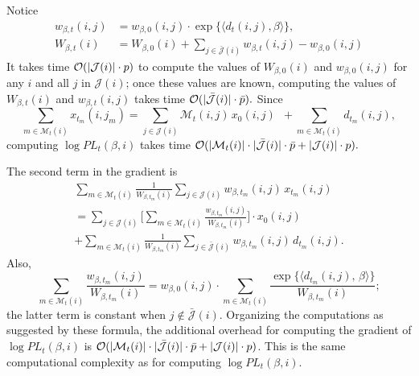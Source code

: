 \documentclass[aoas,preprint]{imsart}
\begin{document}
Notice
\begin{align*}
    w_{\beta,t}(i,j)
        &=
            w_{\beta,0}(i,j)
            \cdot
            \exp\{ \langle d_t(i,j), \beta \rangle \}, \\
    W_{\beta,t}(i)
        &=
            W_{\beta,0}(i)
            +
            \sum_{j \in \mathcal{\bar J}(i)}
                w_{\beta,t}(i,j) - w_{\beta,0}(i,j)
\end{align*}
It takes time $\mathcal{O}(|\mathcal{J}(i)| \cdot p)$ to compute the values of
$W_{\beta,0}(i)$ and $w_{\beta,0}(i,j)$ for any $i$ and all
$j$ in $\mathcal{J}(i)$; once these values are known, computing the values
of $W_{\beta,t}(i)$ and $w_{\beta,t}(i,j)$ takes time
\(
    \mathcal{O}(|\mathcal{\bar J}(i)| \cdot \bar p).
\)
Since
\[
    \sum_{m\in \mathcal{M}_t(i)}
        x_{t_m}\!(i,j_m)
        =
            \sum_{j \in \mathcal{J}(i)}
                \mathcal{M}_t(i,j) \, x_0(i,j)
            \,\,\,
            +
            \sum_{m \in \mathcal{M}_t(i)}
                d_{t_m}\!(i,j),
\]
computing $\log \mathit{PL}_t(\beta, i)$ takes time
\(
    \mathcal{O}(
        |\mathcal{M}_t(i)| \cdot |\mathcal{\bar J}(i)| \cdot \bar p
        +
        |\mathcal{J}(i)| \cdot p
    ).
\)

The second term in the gradient is
\begin{multline*}
    \sum_{m \in \mathcal{M}_t(i)}
        \frac{1}{W_{\beta,t_m}\!(i)}
        \sum_{j \in \mathcal{J}(i)}
            w_{\beta,t_m}\!(i,j)
            \,
            x_{t_m}\!(i,j) \\
    =
    \sum_{j \in \mathcal{J}(i)}
    \bigg[
        \sum_{m \in \mathcal{M}_t(i)}
            \frac{w_{\beta,t_m}\!(i,j)}{W_{\beta,t_m}\!(i)}
    \bigg]
    \cdot
    x_0(i,j) \\
    +
    \sum_{m \in \mathcal{M}_t(i)}
        \frac{1}{W_{\beta, t_m}\!(i)}
        \sum_{j \in \mathcal{\bar J}(i)}
            w_{\beta,t_m}\!(i,j)
            \,
            d_{t_m}\!(i,j).
\end{multline*}
Also,
\[
    \sum_{m \in \mathcal{M}_t(i)}
        \frac{w_{\beta,t_m}\!(i,j)}{W_{\beta,t_m}\!(i)}
    =
        w_{\beta,0}(i,j)
        \cdot
        \sum_{m \in \mathcal{M}_t(i)}
            \frac{
                \exp\{\langle d_{t_m}\!(i,j), \, \beta \rangle \}
            }{
                W_{\beta,t_m}\!(i)
            };
\]
the latter term is constant when $j \notin \mathcal{\bar J}(i)$.
Organizing the computations as suggested by these formula,
the additional overhead for computing the gradient of
$\log \mathit{PL}_t(\beta,i)$ is
\(
    \mathcal{O}(
        |\mathcal{M}_t(i)| \cdot |\mathcal{\bar J}(i)| \cdot \bar p
        +
        |\mathcal{J}(i)| \cdot p
    )
\).
This is the same computational complexity as for computing
$\log \mathit{PL}_t(\beta,i)$.
\end{document}
